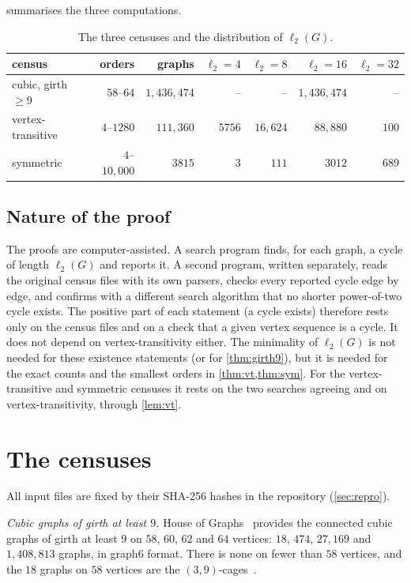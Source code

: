 \documentclass[11pt]{amsart}
\theoremstyle{remark}
\newcommand{\sv}{\ell_2}
\begin{document}
 summarises the three computations.

\begin{table}[ht]
\centering
\caption{The three censuses and the distribution of $\sv(G)$.}
\label{tab:summary}
\begin{tabular}{@{}lrrrrrr@{}}
\toprule
census & orders & graphs & $\sv=4$ & $\sv=8$ & $\sv=16$ & $\sv=32$\\
\midrule
cubic, girth $\ge 9$~\cite{HoG} & $58$--$64$ & $1{,}436{,}474$ & -- & -- & $1{,}436{,}474$ & --\\
vertex-transitive~\cite{PSV2013} & $4$--$1280$ & $111{,}360$ & $5756$ & $16{,}624$ & $88{,}880$ & $100$\\
symmetric~\cite{ConderList} & $4$--$10{,}000$ & $3815$ & $3$ & $111$ & $3012$ & $689$\\
\bottomrule
\end{tabular}
\end{table}

\subsection*{Nature of the proof}
The proofs are computer-assisted. A search program finds, for each graph, a
cycle of length $\sv(G)$ and reports it. A second program, written separately,
reads the original census files with its own parsers, checks every reported
cycle edge by edge, and confirms with a different search algorithm that no
shorter power-of-two cycle exists. The positive part of each statement (a cycle
exists) therefore rests only on the census files and on a check that a given
vertex sequence is a cycle. It does not depend on vertex-transitivity
either. The minimality of $\sv(G)$ is not needed for these existence statements
(or for \cref{thm:girth9}), but it is needed for the exact counts and the
smallest orders in \cref{thm:vt,thm:sym}. For the vertex-transitive and
symmetric censuses it rests on the two searches agreeing and on
vertex-transitivity, through \cref{lem:vt}.

\section{The censuses}\label{sec:censuses}

All input files are fixed by their SHA-256 hashes in the repository
(\cref{sec:repro}).

\emph{Cubic graphs of girth at least $9$.} House of Graphs~\cite{HoG} provides
the connected cubic graphs of girth at least $9$ on $58$, $60$, $62$ and $64$
vertices: $18$, $474$, $27{,}169$ and $1{,}408{,}813$ graphs, in graph6 format.
There is none on fewer than $58$ vertices, and the $18$ graphs on $58$
vertices are the $(3,9)$-cages~\cite{BrinkmannMcKaySaager1995}.
\end{document}
